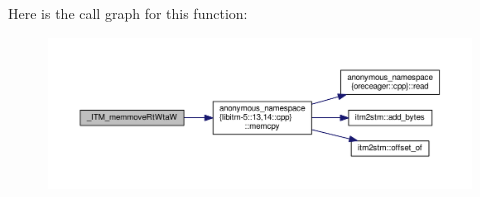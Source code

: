 Here is the call graph for this function\-:
\nopagebreak
\begin{figure}[H]
\begin{center}
\leavevmode
\includegraphics[width=350pt]{libitm-5_813_0014_8cpp_a2acd7d043bcdf7e43975c7f31df9af89_cgraph}
\end{center}
\end{figure}


